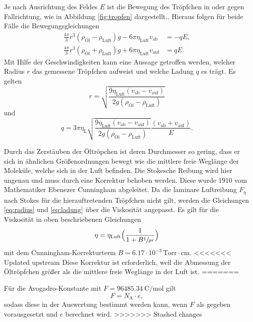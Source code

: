 Je nach Ausrichtung des Feldes $E$ ist die Bewegung des Tröpfchen in oder gegen Fallrichtung, wie in Abbildung \ref{fig:tropfen} dargestellt..
Hieraus folgen für beide Fälle die Bewegungsgleichungen
\begin{align}
	\frac{4\pi}{3}r^3(\rho_\text{Öl}-\rho_\text{Luft})g-6\pi\eta_\text{Luft}v_\text{ab} &= -q E,\\
	\frac{4\pi}{3}r^3(\rho_\text{Öl}+\rho_\text{Luft})g+6\pi\eta_\text{Luft}v_\text{auf}&= q E.
	\label{eq:bewgl_2}
\end{align}
Mit Hilfe der Geschwindigkeiten kann eine Aussage getroffen werden,
welcher Radius $r$ das gemessene Tröpfchen aufweist und welche Ladung $q$ es trägt.\newpage
Es gelten
\begin{equation}
	r=\sqrt{\frac{9\eta_\text{Luft}(v_\text{ab}-v_\text{auf})}{2g(\rho_\text{Öl}-\rho_\text{Luft})}}
	\label{eq:radius}
\end{equation}
und
\begin{equation}
	q=3\pi\eta_\text{L}\sqrt{\frac{9\eta_\text{Luft}(v_\text{ab}-v_\text{auf})}{2g(\rho_\text{Öl}-\rho_\text{Luft})}}\frac{(v_\text{ab}+v_\text{auf})}{E}.
	\label{eq:ladung}
\end{equation}

Durch das Zerstäuben der Öltröpchen ist deren Durchmesser so gering, dass er sich in ähnlichen Größenordnungen bewegt wie die mittlere freie Weglänge der Moleküle, welche sich in der Luft befinden. Die Stokesche Reibung wird hier ungenau und muss durch eine Korrektur behoben werden. Diese wurde 1910 vom Mathematiker Ebenezer Cunningham abgeleitet.
Da die laminare Luftreibung $F_{\eta}$ nach Stokes für die hierauftretenden Tröpfchen nicht gilt, werden die Gleichungen \eqref{eq:radius} und \eqref{eq:ladung} über die Viskosität angepasst. 
Es gilt für die Viskosität in oben beschriebenen Gleichungen
\begin{equation}
	\eta= \eta_\text{Luft}\Bigl(\frac{1}{1+B\sfrac{1}{p r}}\Bigr)
	\label{eq:cunningham}
\end{equation}
mit dem Cunningham-Korrekturterm $B=6.17\cdot 10^{-3}\,\text{Torr}\cdot\text{cm}$.
<<<<<<< Updated upstream
Diese Korrektur ist erforderlich, weil die Abmessung der Öltröpfchen größer als die mittlere freie Weglänge in der Luft ist.
=======

Für die Avogadro-Konstante mit $F=\SI{96485.34}{\coulomb\per\mol}$ gilt
\begin{equation}
	F=N_\text{A}\cdot e,
\label{eq:av}
\end{equation}
sodass diese in der Auswertung bestimmt werden kann, wenn $F$ als gegeben vorausgesetzt und $e$ berechnet wird.
>>>>>>> Stashed changes
